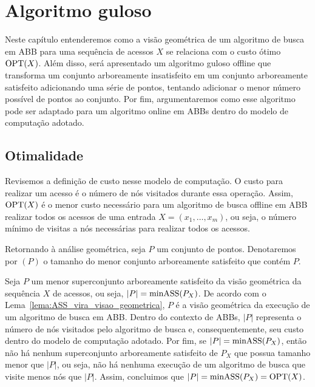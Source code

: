 
\chapter{Algoritmo guloso}
\label{cap:algoritmo-guloso}


Neste capítulo entenderemos como a visão geométrica de um algoritmo de busca em ABB para uma sequência de acessos $X$ se relaciona com o custo ótimo $\mathrm{OPT}(X)$. Além disso, será apresentado um algoritmo guloso offline que transforma um conjunto arboreamente insatisfeito em um conjunto arboreamente satisfeito adicionando uma série de pontos, tentando adicionar o menor número possível de pontos ao conjunto. Por fim, argumentaremos como esse algoritmo pode ser adaptado para um algoritmo online em ABBs dentro do modelo de computação adotado.

\section{Otimalidade} 

Revisemos a definição de custo nesse modelo de computação. O custo para realizar um acesso é o número de nós visitados durante essa operação. Assim, $\mathrm{OPT}(X)$ é o menor custo necessário para um algoritmo de busca offline em ABB realizar todos os acessos de uma entrada $X = (x_{1},\ldots,x_{m})$, ou seja, o número mínimo de visitas a nós necessárias para realizar todos os acessos.

Retornando à análise geométrica, seja $P$ um conjunto de pontos. Denotaremos por \minASS$(P)$ o tamanho do menor conjunto arboreamente satisfeito que contém $P$.


Seja $P$ um menor superconjunto arboreamente satisfeito da visão geométrica da sequência $X$ de acessos, ou seja, $|P| = \mathrm{minASS}(P_X)$. De acordo com o Lema~\ref{lema:ASS_vira_visao_geometrica}, $P$ é a visão geométrica da execução de um algoritmo de busca em ABB. Dentro do contexto de ABBs, $|P|$ representa o número de nós visitados pelo algoritmo de busca e, consequentemente, seu custo dentro do modelo de computação adotado. Por fim, se $|P| = \mathrm{minASS}(P_X)$, então não há nenhum superconjunto arboreamente satisfeito de $P_X$ que possua tamanho menor que $|P|$, ou seja, não há nenhuma execução de um algoritmo de busca que visite menos nós que $|P|$. Assim, concluimos que $|P| = \mathrm{minASS}(P_X) = \mathrm{OPT}(X)$.

